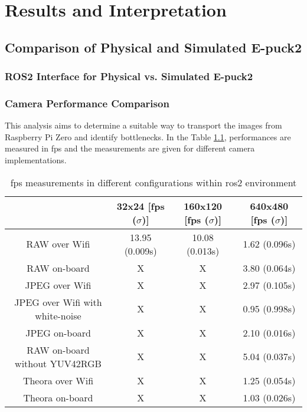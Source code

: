 \chapter{Results and Interpretation}
\label{chap:results}

\section{Comparison of Physical and Simulated E-puck2}

\subsection{ROS2 Interface for Physical vs. Simulated E-puck2}
\subsection{Camera Performance Comparison}
This analysis aims to determine a suitable way to transport the images from Raspberry Pi Zero and identify bottlenecks.
In the Table \ref{tab:results:camera_perf}, performances are measured in \ac{fps} and the measurements are given for different camera implementations.

\begin{table}[H]
    \begin{adjustwidth}{-1.5in}{-1.5in} 
    \centering
    \begin{tabular}{|c|c|c|c|}
        \hline
         & 32x24 [\ac{fps} ($ \sigma $)] & 160x120 [\ac{fps} ($ \sigma $)] & 640x480 [\ac{fps} ($ \sigma $)] \\
         \hline
         RAW over Wifi & 13.95 (0.009s) & 10.08 (0.013s) & 1.62 (0.096s) \\
         \hline
         RAW on-board & X & X & 3.80 (0.064s) \\
        \hline
        JPEG over Wifi & X & X & 2.97 (0.105s) \\
        \hline
        JPEG over Wifi with white-noise & X & X & 0.95 (0.998s) \\
        \hline
        JPEG on-board & X & X & 2.10 (0.016s) \\
        \hline
        RAW on-board without YUV42RGB & X & X & 5.04 (0.037s) \\
        \hline
        Theora over Wifi & X & X & 1.25 (0.054s) \\
        \hline
        Theora on-board & X & X & 1.03 (0.026s) \\
        \hline
    \end{tabular}
    \end{adjustwidth}
    
    \caption{\ac{fps} measurements in different configurations within \ac{ros2} environment}
    \label{tab:results:camera_perf}
\end{table}

